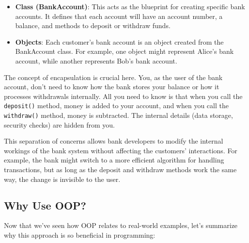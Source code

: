 \documentclass[
  letterpaper,
  DIV=11,
  numbers=noendperiod]{scrreprt}
\providecommand{\tightlist}{%
  \setlength{\itemsep}{0pt}\setlength{\parskip}{0pt}}\usepackage{longtable,booktabs,array}
\begin{document}
\begin{itemize}
\tightlist
\item
  \textbf{Class (BankAccount)}: This acts as the blueprint for creating
  specific bank accounts. It defines that each account will have an
  account number, a balance, and methods to deposit or withdraw funds.
\item
  \textbf{Objects}: Each customer's bank account is an object created
  from the BankAccount class. For example, one object might represent
  Alice's bank account, while another represents Bob's bank account.
\end{itemize}

The concept of encapsulation is crucial here. You, as the user of the
bank account, don't need to know how the bank stores your balance or how
it processes withdrawals internally. All you need to know is that when
you call the \texttt{deposit()} method, money is added to your account,
and when you call the \texttt{withdraw()} method, money is subtracted.
The internal details (data storage, security checks) are hidden from
you.

This separation of concerns allows bank developers to modify the
internal workings of the bank system without affecting the customers'
interactions. For example, the bank might switch to a more efficient
algorithm for handling transactions, but as long as the deposit and
withdraw methods work the same way, the change is invisible to the user.

\hypertarget{why-use-oop}{%
\subsection{Why Use OOP?}\label{why-use-oop}}

Now that we've seen how OOP relates to real-world examples, let's
summarize why this approach is so beneficial in programming:
\end{document}
